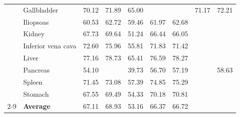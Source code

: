 \begin{table}[t]
\begin{tabular}{@{}llccccccc@{}}
& Gallbladder          & 70.12 & 71.89 & 65.00 & \textbf{\color[HTML]{0073e6}{75.80}} & \textbf{\color[HTML]{FE0000}{76.11}} & 71.17 &72.21\\
& Iliopsoas            & 60.53 & 62.72 & 59.46 & 61.97 & 62.68 & \textbf{\color[HTML]{FE0000}{65.26}} &\textbf{\color[HTML]{0073e6}{64.31}}\\
& Kidney               & 67.73 & 69.64 & 51.24 & 66.44 & 66.05 & \textbf{\color[HTML]{0073e6}{72.54}} &\textbf{\color[HTML]{FE0000}{74.80}}\\
& Inferior vena cava   & 72.60 & 75.96 & 55.81 & 71.83 & 71.42 & \textbf{\color[HTML]{0073e6}{77.26}} &\textbf{\color[HTML]{FE0000}{78.21}}\\
& Liver                & 77.16 & 78.73 & 65.41 & 76.59 & 78.27 & \textbf{\color[HTML]{0073e6}{80.32}} &\textbf{\color[HTML]{FE0000}{80.42}}\\
& Pancreas             & 54.10 & \textbf{\color[HTML]{0073e6}{58.57}} & 39.73 & 56.70 & 57.19 & \textbf{\color[HTML]{FE0000}{60.21}} &58.63\\
& Spleen               & 71.45 & 73.08 & 57.39 & 74.85 & 75.29 & \textbf{\color[HTML]{0073e6}{76.38}} &\textbf{\color[HTML]{FE0000}{76.52}}\\
& Stomach              & 67.55 & 69.49 & 54.33 & 70.18 & 70.81 & \textbf{\color[HTML]{0073e6}{71.09}} &\textbf{\color[HTML]{FE0000}{72.26}}\\
\cmidrule(lr){2-9}
& \textbf{Average}     & 67.11 & 68.93 & 53.16 & 66.37 & 66.72 & \textbf{\color[HTML]{0073e6}{70.62}}&\textbf{\color[HTML]{FE0000}{71.48}} \\
\bottomrule
\end{tabular}
\end{table}

